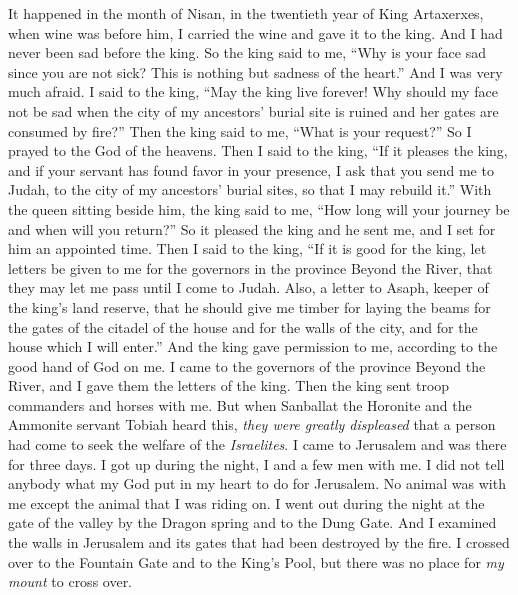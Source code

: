 \begin{biblechapter} %
 It happened in the month of Nisan, in the twentieth year of King Artaxerxes, when wine was before him, I carried the wine and gave it to the king. And I had never been sad before the king.
\verse So the king said to me, “Why is your face sad since you are not sick? This is nothing but sadness of the heart.” And I was very much afraid.
\verse I said to the king, “May the king live forever! Why should my face not be sad when the city of my ancestors’ burial site is ruined and her gates are consumed by fire?”
\verse Then the king said to me, “What is your request?” So I prayed to the God of the heavens.
\verse Then I said to the king, “If it pleases the king, and if your servant has found favor in your presence, I ask that you send me to Judah, to the city of my ancestors’ burial sites, so that I may rebuild it.”
\verse With the queen sitting beside him, the king said to me, “How long will your journey be and when will you return?” So it pleased the king and he sent me, and I set for him an appointed time.
\verse Then I said to the king, “If it is good for the king, let letters be given to me for the governors in the province Beyond the River, that they may let me pass until I come to Judah.
\verse Also, a letter to Asaph, keeper of the king’s land reserve, that he should give me timber for laying the beams for the gates of the citadel of the house and for the walls of the city, and for the house which I will enter.” And the king gave permission to me, according to the good hand of God on me.
\verse I came to the governors of the province Beyond the River, and I gave them the letters of the king. Then the king sent troop commanders and horses with me.
\verse But when Sanballat the Horonite and the Ammonite servant Tobiah heard this, \textit{they were greatly displeased} that a person had come to seek the welfare of the \textit{Israelites}.
 I came to Jerusalem and was there for three days.
\verse I got up during the night, I and a few men with me. I did not tell anybody what my God put in my heart to do for Jerusalem. No animal was with me except the animal that I was riding on.
\verse I went out during the night at the gate of the valley by the Dragon spring and to the Dung Gate. And I examined the walls in Jerusalem and its gates that had been destroyed by the fire.
\verse I crossed over to the Fountain Gate and to the King’s Pool, but there was no place for \textit{my mount} to cross over.

\end{biblechapter}
